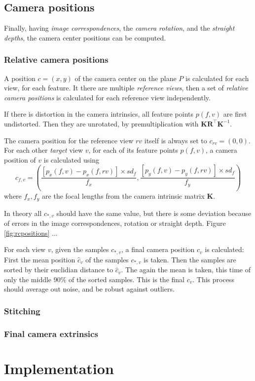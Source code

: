 \documentclass{scrreprt}
\newcommand{\matr}[1]{\mathbf{#1}}
\newcommand{\transpose}[1]{#1^\intercal}
\begin{document}
\pagebreak

\section{Camera positions}
Finally, having \emph{image correspondences}, the \emph{camera rotation}, and the \emph{straight depths}, the camera center positions can be computed.

\subsection{Relative camera positions}
A position $c = (x, y)$ of the camera center on the plane $P$ is calculated for each view, for each feature. It there are multiple \emph{reference views}, then a set of \emph{relative camera positions} is calculated for each reference view independently.

If there is distortion in the camera intrinsics, all feature points $p(f,v)$ are first undistorted. Then they are unrotated, by premultiplication with $\matr{K} \transpose{\matr{R}} \matr{K}^{-1}$.

The camera position for the reference view $rv$  itself is always set to $c_{rv} = (0, 0)$. For each other \emph{target} view $v$, for each of its feature points $p(f,v)$, a camera position of $v$ is calculated using
\begin{equation*}
c_{f,v} = \left( \frac{\left[p_x(f,v) - p_x(f,rv)\right] \times sd_f}{f_x}, \frac{\left[p_y(f,v) - p_y(f,rv)\right] \times sd_f}{f_y} \right)
\end{equation*}
where $f_x, f_y$ are the focal lengths from the camera intrinsic matrix $\matr{K}$.

In theory all $c_{*,v}$ should have the same value, but there is some deviation because of errors in the image correspondences, rotation or straight depth. Figure \ref{fig:rcpositions} ...

For each view $v$, given the samples $c_{*,v}$, a final camera position $c_v$ is calculated: First the mean position $\hat{c}_v$ of the samples $c_{*,v}$ is taken. Then the samples are sorted by their euclidian distance to $\hat{c}_v$. The again the mean is taken, this time of only the middle $90\%$ of the sorted samples. This is the final $c_v$. This process should average out noise, and be robust against outliers.


\subsection{Stitching}


\subsection{Final camera extrinsics}



\chapter{Implementation}

 
\end{document}
